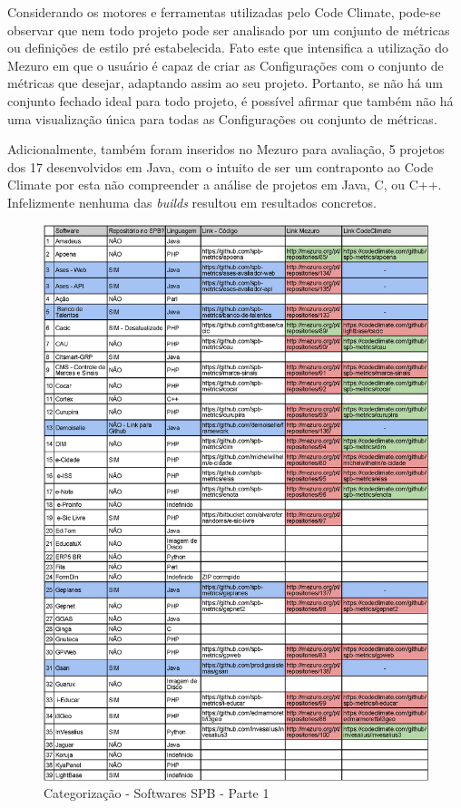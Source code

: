 Considerando os motores e ferramentas utilizadas pelo Code Climate, pode-se
observar que nem todo projeto pode ser analisado por um conjunto de métricas ou
definições de estilo pré estabelecida. Fato este que intensifica a utilização do
Mezuro em que o usuário é capaz de criar as Configurações com o conjunto de
métricas que desejar, adaptando assim ao seu projeto. Portanto, se não há um
conjunto fechado ideal para todo projeto, é possível afirmar que também não há
uma visualização única para todas as Configurações ou conjunto de métricas.

Adicionalmente, também foram inseridos no Mezuro para avaliação, 5 projetos dos
17 desenvolvidos em Java, com o intuito de ser um contraponto ao Code Climate
por esta não compreender a análise de projetos em Java, C, ou C++. Infelizmente
nenhuma das \textit{builds} resultou em resultados concretos.

\newpage

\begin{figure}[!htb]
	\centering
    \includegraphics[keepaspectratio=true,scale=0.85]
    {tabelas/spb_1_v2-crop.eps}
  \caption{Categorização - Softwares SPB - Parte 1}
  \label{fig:softwares_spb_1}
\end{figure}

